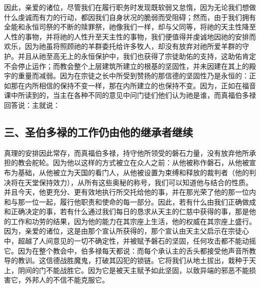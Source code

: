 因此，亲爱的诸位，尽管我们在履行职务时发现既软弱又怠惰，因为无论我们想做什么虔诚而有力的行动，都因我们自身状况的脆弱而受阻碍；然而，由于我们拥有全能和永恒司祭的不断的赎罪祭，祂像我们一样，却与父同等，将祂的天主性降至人性的事物，并将祂的人性升至天主性的事物，我们便值得并虔诚地因祂的安排而欢乐，因为祂虽将照顾祂的羊群委托给许多牧人，却没有放弃对祂所爱羊群的守护。并且从祂至高无上的永恒保护中，我们也获得了宗徒助佑的支持，这助佑肯定不会停止运作；而教会整个上层建筑所建立的根基的坚固性，并未因建在其上的殿宇的重量而减弱。因为在宗徒之长中所受到赞扬的那信德的坚固性乃是永恒的：正如那在内所相信的保持不变一样，那在内所建立的也保持不变。因为，正如在福音课中所读到的，当主在各种不同的意见中问门徒们他们认为祂是谁，而真福伯多禄回答说：主就说：\par


\subsection{三、圣伯多禄的工作仍由他的继承者继续}

真理的安排因此常存，而真福伯多禄，持守他所领受的磐石力量，没有放弃他所承担的教会舵轮。因为他以这样的方式被立在众人之前：从他被称作磐石，从他被宣布为基础，从他被立为天国的看门人，从他被设置为束缚和释放的裁判者（他的判决将在天堂保持效力），从所有这些奥秘的称号，我们可以知道他与结合的性质。并且今天，他更充分、更有效地执行所交托给他的事，并在那光荣了他的那一位内和与那一位一起，履行他职责和使命的每一部分。因此，若有什么由我们正确做成和正确决定的事，若有什么通过我们每日的恳求从天主的仁慈中获得的事，那是他的工作和功劳的结果，因为他的能力在其宗座上生活，他的权威在其宗座上盛行。因为，亲爱的诸位，这是由那个宣认所获得的，那个宣认由天主父启示在宗徒心中，超越了人间意见的一切不确定性，并被赋予磐石的坚固，任何攻击都不能动摇它。因为在整个教会中，伯多禄每天都说：而每个承认主的舌头都接受他声音所教导的教训。这信德战胜魔鬼，打破其囚犯的锁链。它将我们从地土拔出，栽种于天上，阴间的门不能战胜它。因为它是被天主赋予如此坚固，以致异端的邪恶不能损害它，外邦人的不信不能克服它。\par

